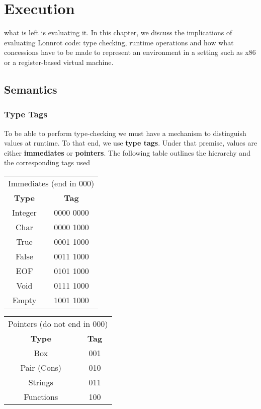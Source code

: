 \chapter{Execution}\label{ch:exe}

 what is left is evaluating it. In this
chapter, we discuss the implications of evaluating Lonnrot code: type checking,
runtime operations and how what concessions have to be made to represent an environment
in a setting such as x86 or a register-based virtual machine.

\section{Semantics}\label{sec:ch3_semantics}
\subsection{Type Tags}
To be able to perform type-checking we must have a mechanism to distinguish values
at runtime. To that end, we use \textbf{type tags}. Under that premise, values are either
\textbf{immediates} or \textbf{pointers}.
The following table outlines the hierarchy and the corresponding tags used

\begin{center}
  \begin{tabular}[h]{c | c}
    \toprule
    \multicolumn{2}{c}{Immediates (end in 000)}\\
    \textbf{Type} & \textbf{Tag}\\
    \midrule
    Integer & 0000 0000 \\
    Char    & 0000 1000 \\
    True    & 0001 1000 \\
    False   & 0011 1000 \\
    EOF     & 0101 1000 \\
    Void    & 0111 1000 \\
    Empty   & 1001 1000 \\
    \bottomrule
  \end{tabular}
\end{center}

\begin{center}
  \begin{tabular}[h]{c | c}
    \toprule
    \multicolumn{2}{c}{Pointers (do not end in 000)}\\
    \textbf{Type} & \textbf{Tag}\\
    \midrule
    Box         & 001 \\
    Pair (Cons) & 010 \\
    Strings     & 011 \\
    Functions   & 100 \\
    \bottomrule
  \end{tabular}
\end{center}
\vspace{1cm}

